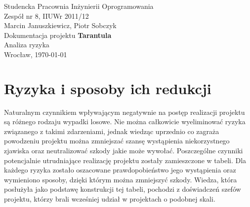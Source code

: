 \documentclass[11pt,leqno]{article}
\begin{document}
\begin{center}
\thispagestyle{empty}
{\Large Studencka Pracownia Inżynierii Oprogramowania}\\[0.5cm]
{\Large Zespół nr 8, IIUWr 2011/12}\\[2.5cm]

{\large Marcin Januszkiewicz, Piotr Sobczyk}\\[0.5cm]
{\huge Dokumentacja projektu \textbf{Tarantula}}\\[0.25cm]
{\huge Analiza ryzyka}\\[0.5cm]
\vfill
{\large Wrocław, \today}
\end{center}

\newpage
\tableofcontents
\newpage

\section{Ryzyka i sposoby ich redukcji}
Naturalnym czynnikiem wpływającym negatywnie na postęp realizacji projektu są różnego rodzaju wypadki losowe. Nie można całkowicie wyeliminować ryzyka związanego
z takimi zdarzeniami, jednak wiedząc uprzednio co zagraża powodzeniu projektu można zmniejszać szansę wystąpienia niekorzystnego zjawiska oraz neutralizować szkody
jakie może wywołać. Poszczególne czynniki potencjalnie utrudniające realizację projektu zostały zamieszczone w tabeli. 
Dla każdego ryzyka zostało oszacowane prawdopobieństwo jego wystąpienia oraz wymieniono sposoby, dzięki którym można zmniejszyć szkody. 
Wiedza, która posłużyła jako podstawę konstrukcji tej tabeli, pochodzi z doświadczeń szefów projektu, którzy brali wcześniej udział w projektach o podobnej skali.
\end{document}

